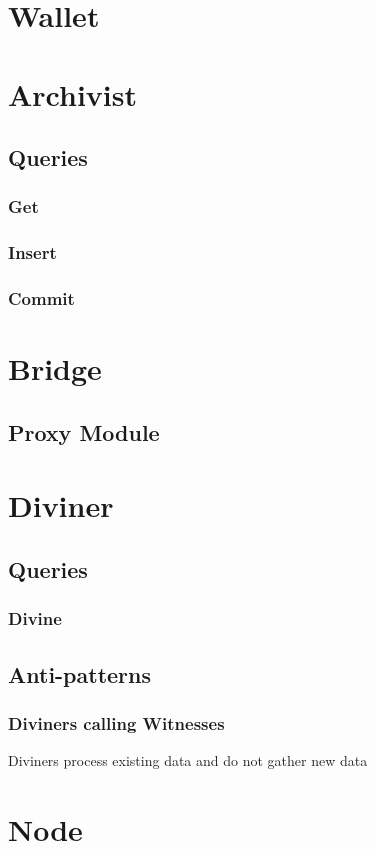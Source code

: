 \documentclass{article}
\begin{document}
\section{Wallet}
\section{Archivist}
\subsection{Queries}
\subsubsection{Get}
\subsubsection{Insert}
\subsubsection{Commit}
\section{Bridge}
\subsection{Proxy Module}
\section{Diviner}
\subsection{Queries}
\subsubsection{Divine}
\subsection{Anti-patterns}
\subsubsection{Diviners calling Witnesses}
Diviners process existing data and do not gather new data
\section{Node}
\end{document}
